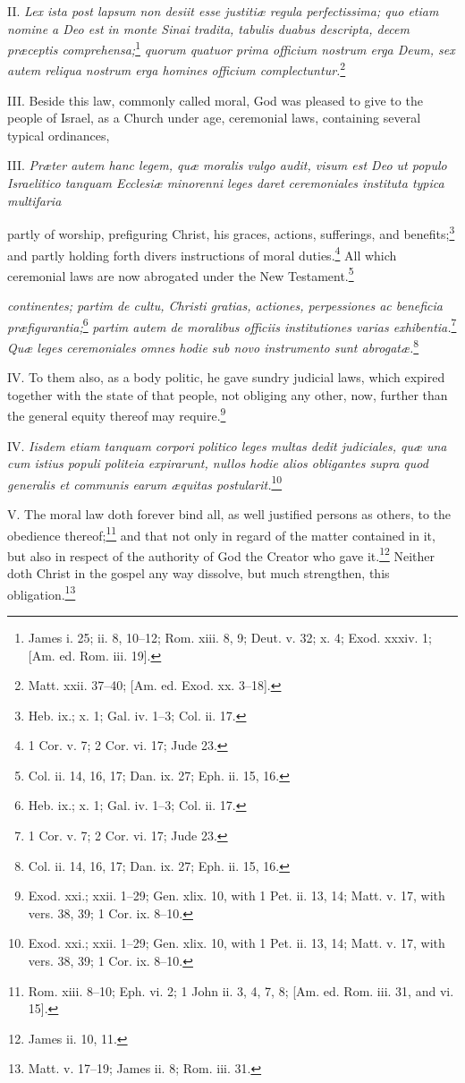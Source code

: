 II. \emph{Lex ista post lapsum non desiit esse justitiæ regula perfectissima; quo etiam nomine a Deo est in monte Sinai tradita, tabulis duabus descripta, decem præceptis comprehensa;}\footnote{James i. 25; ii. 8, 10–12; Rom. xiii. 8, 9; Deut. v. 32; x. 4; Exod. xxxiv. 1; [Am. ed. Rom. iii. 19].}\emph{ quorum quatuor prima officium nostrum erga Deum, sex autem reliqua nostrum erga homines officium complectuntur.}\footnote{Matt. xxii. 37–40; [Am. ed. Exod. xx. 3–18].}

III. Beside this law, commonly called moral, God was pleased to give to the people of Israel, as a Church under age, ceremonial laws, containing several typical ordinances,

III. \emph{Præter autem hanc legem, quæ moralis vulgo audit, visum est Deo ut populo Israelitico tanquam Ecclesiæ minorenni leges daret ceremoniales instituta typica multifaria }

partly of worship, prefiguring Christ, his graces, actions, sufferings, and benefits;\footnote{Heb. ix.; x. 1; Gal. iv. 1–3; Col. ii. 17.} and partly holding forth divers instructions of moral duties.\footnote{1 Cor. v. 7; 2 Cor. vi. 17; Jude 23.} All which ceremonial laws are now abrogated under the New Testament.\footnote{Col. ii. 14, 16, 17; Dan. ix. 27; Eph. ii. 15, 16.}

\emph{continentes; partim de cultu, Christi gratias, actiones, perpessiones ac beneficia præfigurantia;}\footnote{Heb. ix.; x. 1; Gal. iv. 1–3; Col. ii. 17.}\emph{ partim autem de moralibus officiis institutiones varias exhibentia.}\footnote{1 Cor. v. 7; 2 Cor. vi. 17; Jude 23.}\emph{ Quæ leges ceremoniales omnes hodie sub novo instrumento sunt abrogatæ.}\footnote{Col. ii. 14, 16, 17; Dan. ix. 27; Eph. ii. 15, 16.}

IV. To them also, as a body politic, he gave sundry judicial laws, which expired together with the state of that people, not obliging any other, now, further than the general equity thereof may require.\footnote{Exod. xxi.; xxii. 1–29; Gen. xlix. 10, with 1 Pet. ii. 13, 14; Matt. v. 17, with vers. 38, 39; 1 Cor. ix. 8–10.}

IV. \emph{Iisdem etiam tanquam corpori politico leges multas dedit judiciales, quæ una cum istius populi politeia expirarunt, nullos hodie alios obligantes supra quod generalis et communis earum æquitas postularit.}\footnote{Exod. xxi.; xxii. 1–29; Gen. xlix. 10, with 1 Pet. ii. 13, 14; Matt. v. 17, with vers. 38, 39; 1 Cor. ix. 8–10.}

V. The moral law doth forever bind all, as well justified persons as others, to the obedience thereof;\footnote{Rom. xiii. 8–10; Eph. vi. 2; 1 John ii. 3, 4, 7, 8; [Am. ed. Rom. iii. 31, and vi. 15].} and that not only in regard of the matter contained in it, but also in respect of the authority of God the Creator who gave it.\footnote{James ii. 10, 11.} Neither doth Christ in the gospel any way dissolve, but much strengthen, this obligation.\footnote{Matt. v. 17–19; James ii. 8; Rom. iii. 31.}

